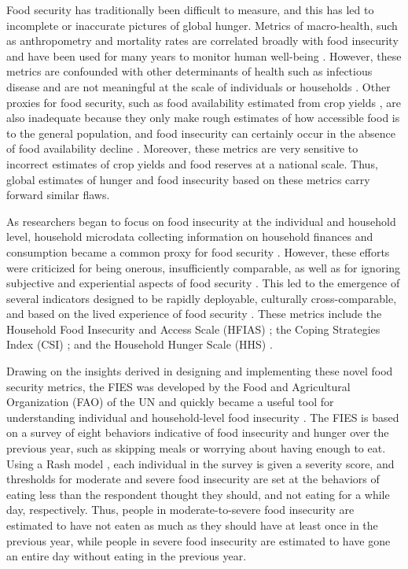 \documentclass{article}
\begin{document}
Food security has traditionally been difficult to measure, and this has led to incomplete or inaccurate pictures of global hunger.  Metrics of macro-health, such as anthropometry and mortality rates are correlated broadly with food insecurity and have been used for many years to monitor human well-being \citep{Puffer1973, Habicht1974}.  However, these metrics are confounded with other determinants of health such as infectious disease and are not meaningful at the scale of individuals or households \citep{Perumal2018}.  Other proxies for food security, such as food availability estimated from crop yields \citep{Maxwell1992}, are also inadequate because they only make rough estimates of how accessible food is to the general population, and food insecurity can certainly occur in the absence of food availability decline \citep{Sen1983}.  Moreover, these metrics are very sensitive to incorrect estimates of crop yields and food reserves at a national scale.  Thus, global estimates of hunger and food insecurity based on these metrics carry forward similar flaws.

As researchers began to focus on food insecurity at the individual and household level, household microdata collecting information on household finances and consumption became a common proxy for food security \citep{Haddad1994}.  However, these efforts were criticized for being onerous, insufficiently comparable, as well as for ignoring subjective and experiential aspects of food security \citep{Maxwell1996}.  This led to the emergence of several indicators designed to be rapidly deployable, culturally cross-comparable, and based on the lived experience of food security \citep{Jones2013}.  These metrics include the Household Food Insecurity and Access Scale (HFIAS) \citep{Coates2007}; the Coping Strategies Index (CSI) \citep{Maxwell1999}; and the Household Hunger Scale (HHS) \citep{Ballard2011}.

Drawing on the insights derived in designing and implementing these novel food security metrics, the FIES was developed by the Food and Agricultural Organization (FAO) of the UN \cite{Ballard2013} and quickly became a useful tool for understanding individual and household-level food insecurity \citep{smith2017world}.  The FIES is based on a survey of eight behaviors indicative of food insecurity and hunger over the previous year, such as skipping meals or worrying about having enough to eat.  Using a Rash model \citep{Cafiero2018}, each individual in the survey is given a severity score, and thresholds for moderate and severe food insecurity are set at the behaviors of eating less than the respondent thought they should, and not eating for a while day, respectively.  Thus, people in moderate-to-severe food insecurity are estimated to have not eaten as much as they should have at least once in the previous year, while people in severe food insecurity are estimated to have gone an entire day without eating in the previous year.
\end{document}
